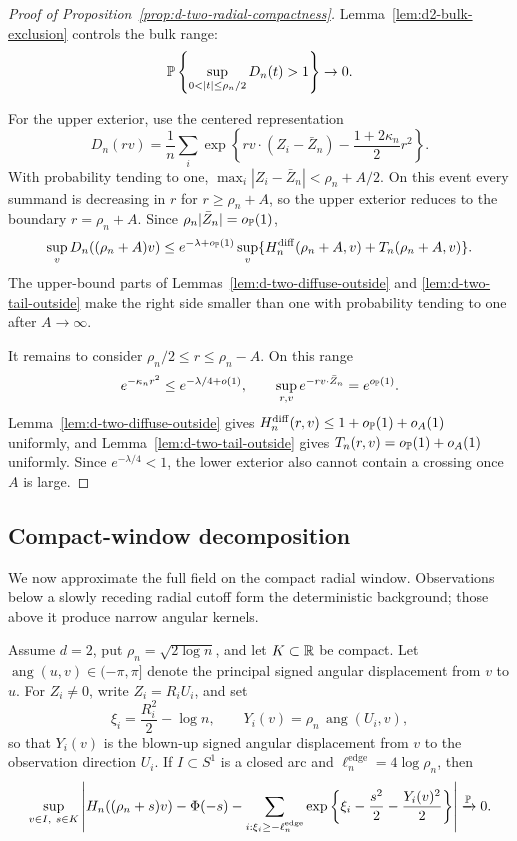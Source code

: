 \begin{proof}[Proof of Proposition~\ref{prop:d-two-radial-compactness}]
Lemma~\ref{lem:d2-bulk-exclusion} controls the bulk range:
\[
    \Pbb\left\{\sup_{0<|t|\le\rho_n/2}D_n(t)>1\right\}\to0 .
\]

For the upper exterior, use the centered representation
\[
    D_n(rv)=\frac1n\sum_i
    \exp\left\{rv\cdot (Z_i-\bar Z_n)-\frac{1+2\kappa_n}{2}r^2\right\}.
\]
With probability tending to one, \(\max_i|Z_i-\bar Z_n|<\rho_n+A/2\).
On this event every summand is decreasing in \(r\) for \(r\ge\rho_n+A\),
so the upper exterior reduces to the boundary \(r=\rho_n+A\).  Since
\(\rho_n|\bar Z_n|=o_{\mathbb P}(1)\),
\[
    \sup_{v}D_n((\rho_n+A)v)
    \le
    e^{-\lambda+o_{\mathbb P}(1)}
    \sup_v\{H_n^{\mathrm{diff}}(\rho_n+A,v)+T_n(\rho_n+A,v)\}.
\]
The upper-bound parts of Lemmas~\ref{lem:d-two-diffuse-outside} and
\ref{lem:d-two-tail-outside} make the right side smaller than one with
probability tending to one after \(A\to\infty\).

It remains to consider \(\rho_n/2\le r\le\rho_n-A\).  On this range
\[
    e^{-\kappa_nr^2}\le e^{-\lambda/4+o(1)},
    \qquad
    \sup_{r,v}e^{-rv\cdot\bar Z_n}=e^{o_{\mathbb P}(1)} .
\]
Lemma~\ref{lem:d-two-diffuse-outside} gives
\(H_n^{\mathrm{diff}}(r,v)\le1+o_{\mathbb P}(1)+o_A(1)\) uniformly, and
Lemma~\ref{lem:d-two-tail-outside} gives
\(T_n(r,v)=o_{\mathbb P}(1)+o_A(1)\) uniformly.  Since \(e^{-\lambda/4}<1\),
the lower exterior also cannot contain a crossing once \(A\) is large.
\end{proof}

\subsection{Compact-window decomposition}

We now approximate the full field on the compact radial window. Observations
below a slowly receding radial cutoff form the
deterministic background; those above it produce narrow angular kernels.
\begin{proposition}
\label{prop:two-d-compact-decomposition}
Assume \(d=2\), put \(\rho_n=\sqrt{2\log n}\), and let \(K\subset\mathbb R\) be compact.  Let \(\operatorname{ang}(u,v)\in(-\pi,\pi]\) denote the principal signed angular displacement from \(v\) to \(u\).  For \(Z_i\ne0\), write \(Z_i=R_iU_i\), and set
\[
    \xi_i=\frac{R_i^2}{2}-\log n,
    \qquad
    Y_i(v)=\rho_n\,\operatorname{ang}(U_i,v),
\]
so that \(Y_i(v)\) is the blown-up signed angular displacement from \(v\) to
the observation direction \(U_i\). If \(I\subset S^1\) is a closed arc and
\(\ell_n^{\mathrm{edge}}=4\log\rho_n\), then
\[
    \sup_{v\in I,\ s\in K}
    \left|
    H_n((\rho_n+s)v)-\Phi(-s)
    -
    \sum_{i:\xi_i\ge -\ell_n^{\mathrm{edge}}}
    \exp\left\{\xi_i-\frac{s^2}{2}-\frac{Y_i(v)^2}{2}\right\}
    \right|
    \xrightarrow{\mathbb P}0 .
\]
\end{proposition}


